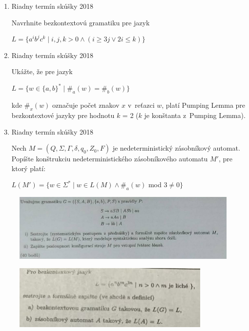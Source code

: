 \documentclass[]{article}
\begin{document}
\begin{enumerate}
		\item Riadny termín skúšky 2018
		
		Navrhnite bezkontextovú gramatiku pre jazyk
		
		$L = \{a^ib^jc^k \mid i,j,k > 0 \land (i \geq 3j \lor 2i \leq k)\}$
		
		\item Riadny termín skúšky 2018
		
		Ukážte, že pre jazyk
		
		$L = \{w \in \{a,b\}^* \mid \#_a(w) = \#_b(w)\}$
		
		kde $\#_x(w)$ označuje počet znakov $x$ v~reťazci $w$, platí Pumping Lemma pre bezkontextové jazyky pre hodnotu $k$ = 2 ($k$ je konštanta z~Pumping Lemma).
		
		\item Riadny termín skúšky 2018 
		
		Nech $M = (Q, \Sigma, \Gamma, \delta, q_0, Z_0, F)$ je nedeterministický zásobníkový automat. Popíšte konštrukciu nedeterministického zásobníkového automatu $M'$, pre ktorý platí:
		
		$L(M') = \{w \in \Sigma^* \mid w \in L(M) \land \#_a(w)$ mod $3 \neq 0\}$
	\end{enumerate}
	
	\begin{figure}[H]
		\includegraphics[width=\textwidth]{tasks/bezkontextove/task7.png}
	\end{figure}

	
	\begin{figure}[H]
		\includegraphics[width=\textwidth]{tasks/bezkontextove/task13.png}
	\end{figure}
	
\end{document}
